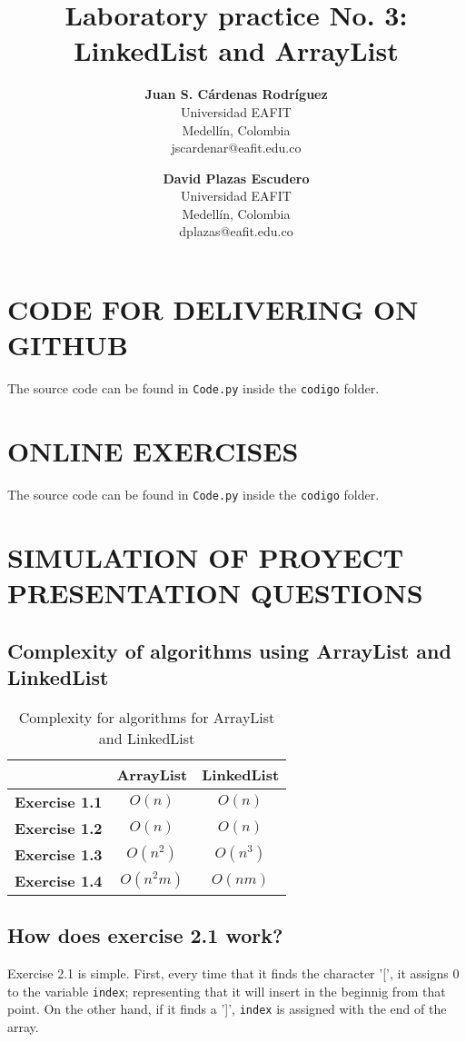 \documentclass[a4paper,12pt]{article}
\title{\color{Eblue}\textbf{Laboratory practice No. 3: LinkedList and ArrayList}}
\author{
  \textbf{Juan S. Cárdenas Rodríguez}\\
  Universidad EAFIT\\
  Medellín, Colombia\\
  jscardenar@eafit.edu.co
\and
  \textbf{David Plazas Escudero}\\
  Universidad EAFIT\\
  Medellín, Colombia\\
  dplazas@eafit.edu.co
}
\begin{document}
  \maketitle
  \thispagestyle{fancy}

  \section{CODE FOR DELIVERING ON GITHUB}
  The source code can be found in \texttt{Code.py} inside the \texttt{codigo} folder.

  \section{ONLINE EXERCISES}
  The source code can be found in \texttt{Code.py} inside the \texttt{codigo} folder.

  \section{SIMULATION OF PROYECT PRESENTATION QUESTIONS}
    \subsection{Complexity of algorithms using ArrayList and LinkedList}
      \begin{table}[H]
      \centering
      \caption{Complexity for algorithms for ArrayList and LinkedList}
        \begin{tabular}{ccc}
        \hline
          \textbf{}             & \textbf{ArrayList} & \textbf{LinkedList} \\ \hline
          \textbf{Exercise 1.1} & $O(n)$             & $O(n)$              \\
          \textbf{Exercise 1.2} & $O(n)$             & $O(n)$              \\
          \textbf{Exercise 1.3} & $O(n^2)$           & $O(n^3)$            \\
          \textbf{Exercise 1.4} & $O(n^2m)$          & $O(nm)$             \\ \hline
        \end{tabular}
      \end{table}
    \subsection{How does exercise 2.1 work?}
      Exercise 2.1 is simple. First, every time that it finds the character '[', it assigns 0
      to the variable \texttt{index}; representing that it will insert in the beginnig from that point.
      On the other hand, if it finds a ']', \texttt{index} is assigned with the end of the array.
\end{document}
